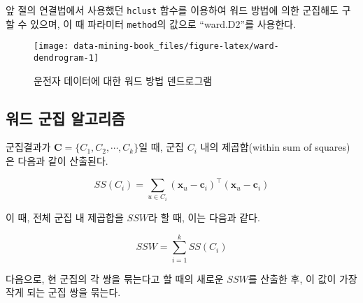 \documentclass[]{book}
\newenvironment{Shaded}{\begin{snugshade}}{\end{snugshade}}
\newcommand{\DataTypeTok}[1]{\textcolor[rgb]{0.13,0.29,0.53}{#1}}
\newcommand{\DecValTok}[1]{\textcolor[rgb]{0.00,0.00,0.81}{#1}}
\newcommand{\KeywordTok}[1]{\textcolor[rgb]{0.13,0.29,0.53}{\textbf{#1}}}
\newcommand{\NormalTok}[1]{#1}
\newcommand{\OperatorTok}[1]{\textcolor[rgb]{0.81,0.36,0.00}{\textbf{#1}}}
\newcommand{\OtherTok}[1]{\textcolor[rgb]{0.56,0.35,0.01}{#1}}
\newcommand{\StringTok}[1]{\textcolor[rgb]{0.31,0.60,0.02}{#1}}
\begin{document}
앞 절의 연결법에서 사용했던 \texttt{hclust} 함수를 이용하여 워드 방법에 의한 군집해도 구할 수 있으며, 이 때 파라미터 \texttt{method}의 값으로 ``ward.D2''를 사용한다.

\begin{Shaded}
\end{Shaded}

\begin{figure}

{\centering \texttt{[image: data-mining-book\_files/figure-latex/ward-dendrogram-1]} 

}

\caption{운전자 데이터에 대한 워드 방법 덴드로그램}\label{fig:ward-dendrogram}
\end{figure}

\hypertarget{ward-method-algorithm}{%
\subsection{워드 군집 알고리즘}\label{ward-method-algorithm}}

군집결과가 \(\mathbf{C} = \{ C_1, C_2, \cdots, C_k \}\)일 때, 군집 \(C_i\) 내의 제곱합(within sum of squares)은 다음과 같이 산출된다.

\begin{equation*}
SS(C_i) = \sum_{u \in C_i} \left(\mathbf{x}_u - \mathbf{c}_i\right)^\top\left(\mathbf{x}_u - \mathbf{c}_i\right)
\end{equation*}

이 때, 전체 군집 내 제곱합을 \(SSW\)라 할 때, 이는 다음과 같다.

\begin{equation*}
SSW = \sum_{i = 1}^{k} SS(C_i)
\end{equation*}

다음으로, 현 군집의 각 쌍을 묶는다고 할 때의 새로운 \(SSW\)를 산출한 후, 이 값이 가장 작게 되는 군집 쌍을 묶는다.
\end{document}
